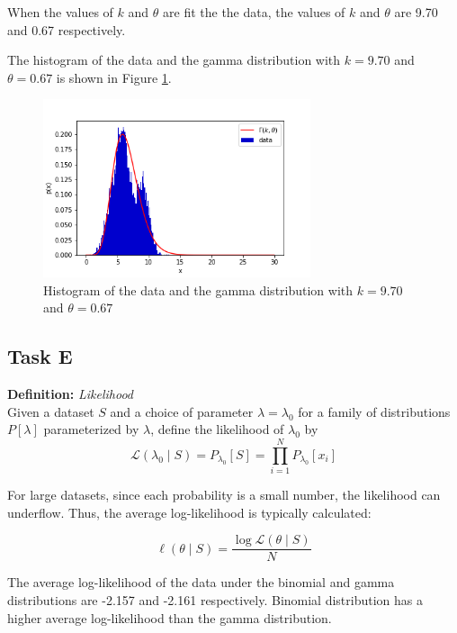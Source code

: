 When the values of $k$ and $\theta$ are fit the the data, the values of $k$ and $\theta$ are 9.70 and 0.67 respectively.

The histogram of the data and the gamma distribution with $k=9.70$ and $\theta=0.67$ is shown in Figure \ref{fig:q3_hist_gamma}.

\begin{figure}[H]
    \centering
    \includegraphics[width=0.7\textwidth]{images/3d.png}
    \caption{Histogram of the data and the gamma distribution with $k=9.70$ and $\theta=0.67$}
    \label{fig:q3_hist_gamma}
\end{figure}

\subsection{Task E}

\textbf{Definition:} \textit{Likelihood} \\
    Given a dataset $S$ and a choice of parameter $\lambda = \lambda_0$ for a family of distributions $P[\lambda]$ parameterized by $\lambda$, define the likelihood of $\lambda_0$ by
    \begin{equation*}
        \mathcal{L}(\lambda_0 \mid S) = P_{\lambda_0}[S] = \prod_{i=1}^{N} P_{\lambda_0}[x_i]
    \end{equation*}

For large datasets, since each probability is a small number, the likelihood can underflow. Thus, the average log-likelihood is typically calculated:

\begin{equation*}
    \ell(\theta \mid S) = \frac{\log \mathcal{L}(\theta \mid S)}{N}
\end{equation*}

The average log-likelihood of the data under the binomial and gamma distributions are -2.157 and -2.161 respectively. Binomial distribution has a higher average log-likelihood than the gamma distribution.


